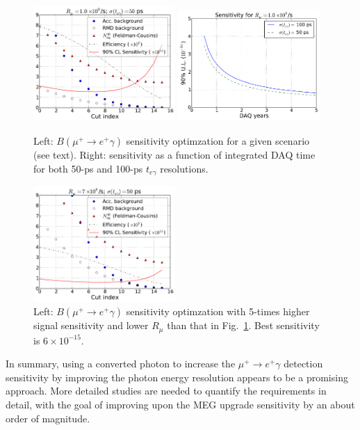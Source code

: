 \begin{figure}[htbp]
   \centering
   \includegraphics[width=0.48\textwidth]{Figures/muegamma-sens-1e9-1p5y-50ps.pdf} 
   \includegraphics[width=0.48\textwidth]{Figures/muegamma-sens-years-1e9-2.pdf} 
   \caption{Left: $B(\mu^+\to e^+\gamma)$ sensitivity optimzation for a given
scenario (see text). Right: sensitivity as a function of integrated DAQ time for both 50-ps and 100-ps $t_{e\gamma}$ resolutions.}
   \label{fig:muegamma-sensitivity}
\end{figure}

\begin{figure}[htbp]
\centering
\includegraphics[width=0.48\textwidth]{Figures/muegamma-sens-7e8-1p5y-50ps-x5sigeff.pdf}
\caption{Left: $B(\mu^+\to e^+\gamma)$ sensitivity optimzation with 5-times
higher signal sensitivity and lower $R_\mu$ than that in 
Fig.~\ref{fig:muegamma-sensitivity}. Best sensitivity is $6\times 10^{-15}$.}
\label{fig:muegamma-sens-5x}
\end{figure}


In summary, using a converted photon to increase the $\mu^+\to e^+\gamma$ detection
sensitivity by improving the photon energy resolution appears to be a promising approach. More detailed studies are 
needed to quantify the requirements in detail, with the goal of improving upon the MEG upgrade
sensitivity by an about order of magnitude.
